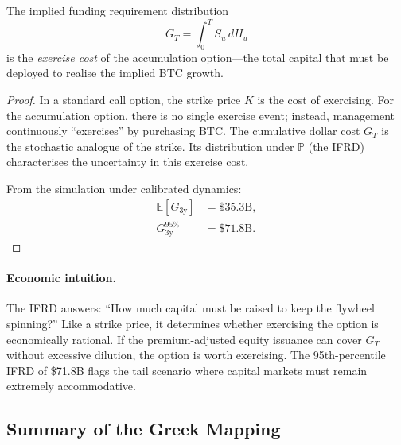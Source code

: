 \begin{proposition}\label{prop:ifrd-strike}
The implied funding requirement distribution
$$
  G_T = \int_0^T S_u\,dH_u
$$
is the \emph{exercise cost} of the accumulation option---the total capital
that must be deployed to realise the implied BTC growth.
\end{proposition}

\begin{proof}
In a standard call option, the strike price $K$ is the cost of exercising.
For the accumulation option, there is no single exercise event; instead,
management continuously ``exercises'' by purchasing BTC.  The cumulative
dollar cost $G_T$ is the stochastic analogue of the strike.  Its distribution
under $\mathbb{P}$ (the IFRD) characterises the uncertainty in this
exercise cost.

From the simulation under calibrated dynamics:
\begin{align*}
  \mathbb{E}[G_{3\mathrm{y}}] &= \$35.3\text{B}, \\
  G_{3\mathrm{y}}^{95\%} &= \$71.8\text{B}.
\end{align*}
\end{proof}

\paragraph{Economic intuition.}
The IFRD answers: ``How much capital must be raised to keep the flywheel
spinning?''  Like a strike price, it determines whether exercising the option
is economically rational.  If the premium-adjusted equity issuance can cover
$G_T$ without excessive dilution, the option is worth exercising.  The
95th-percentile IFRD of \$71.8B flags the tail scenario where capital markets
must remain extremely accommodative.

\subsection{Summary of the Greek Mapping}

